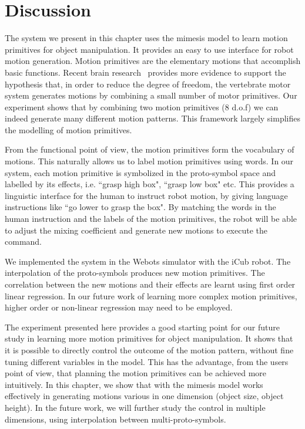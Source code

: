 \section{Discussion}
\label{cha5:sec4}

The system we present in this chapter uses the mimesis model to learn motion primitives for object manipulation. It provides an easy to use interface for robot motion generation. Motion primitives are the elementary motions that accomplish basic functions. Recent brain research~\cite{bizzi2008combining} provides more evidence to support the hypothesis that, in order to reduce the degree of freedom, the vertebrate motor system generates motions by combining a small number of motor primitives. Our experiment shows that by combining two motion primitives (8 d.o.f) we can indeed generate many different motion patterns. This framework largely simplifies the modelling of motion primitives.

From the functional point of view, the motion primitives form the vocabulary of motions. This naturally allows us to label motion primitives using words. In our system, each motion primitive is symbolized in the proto-symbol space and labelled by its effects, i.e. ``grasp high box", ``grasp low box" etc. This provides a linguistic interface for the human to instruct robot motion, by giving language instructions like ``go lower to grasp the box". By matching the words in the human instruction and the labels of the motion primitives, the robot will be able to adjust the mixing coefficient and generate new motions to execute the command.

We implemented the system in the Webots simulator with the iCub robot. The interpolation of the proto-symbols produces new motion primitives. The correlation between the new motions and their effects are learnt using first order linear regression. In our future work of learning more complex motion primitives, higher order or non-linear regression may need to be employed.

The experiment presented here provides a good starting point for our future study in learning more motion primitives for object manipulation. It shows that it is possible to directly control the outcome of the motion pattern, without fine tuning different variables in the model. This has the advantage, from the users point of view, that planning the motion primitives can be achieved more intuitively. In this chapter, we show that with the mimesis model works effectively in generating motions various in one dimension (object size, object height). In the future work, we will further study the control in multiple dimensions, using interpolation between multi-proto-symbols.
